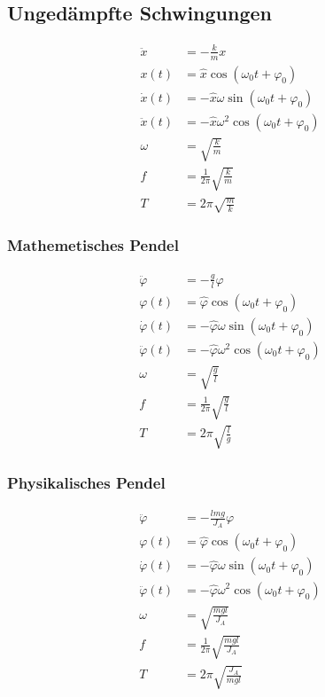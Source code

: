 \subsection{Ungedämpfte Schwingungen}

\begin{align*}
\ddot{x}&=-\frac{k}{m}x\\
x(t)&=\hat{x}\cos(\omega_0 t+\varphi_0)\\
\dot{x}(t)&=-\hat{x}\omega\sin(\omega_0 t+\varphi_0)\\
\ddot{x}(t)&=-\hat{x}\omega^2\cos(\omega_0 t+\varphi_0)\\
\omega&=\sqrt{\frac{k}{m}}\\
f&=\frac{1}{2\pi}\sqrt{\frac{k}{m}}\\
T&=2\pi\sqrt{\frac{m}{k}}
\end{align*}

\newpage
\begin{multicols}{2}{}
\subsubsection{Mathemetisches Pendel}
\begin{align*}
\ddot{\varphi}&=-\frac{g}{l}\varphi\\
\varphi(t)&=\hat{\varphi}\cos(\omega_0 t+\varphi_0)\\
\dot{\varphi}(t)&=-\hat{\varphi}\omega\sin(\omega_0 t+\varphi_0)\\
\ddot{\varphi}(t)&=-\hat{\varphi}\omega^2\cos(\omega_0 t+\varphi_0)\\
\omega&=\sqrt{\frac{g}{l}}\\
f&=\frac{1}{2\pi}\sqrt{\frac{g}{l}}\\
T&=2\pi\sqrt{\frac{l}{g}}
\end{align*}

\subsubsection{Physikalisches Pendel}
\begin{align*}
\ddot{\varphi}&=-\frac{lmg}{J_A}\varphi\\
\varphi(t)&=\hat{\varphi}\cos(\omega_0 t+\varphi_0)\\
\dot{\varphi}(t)&=-\hat{\varphi}\omega\sin(\omega_0 t+\varphi_0)\\
\ddot{\varphi}(t)&=-\hat{\varphi}\omega^2\cos(\omega_0 t+\varphi_0)\\
\omega&=\sqrt{\frac{mgl}{J_A}}\\
f&=\frac{1}{2\pi}\sqrt{\frac{mgl}{J_A}}\\
T&=2\pi\sqrt{\frac{J_A}{mgl}}
\end{align*}
\end{multicols}

